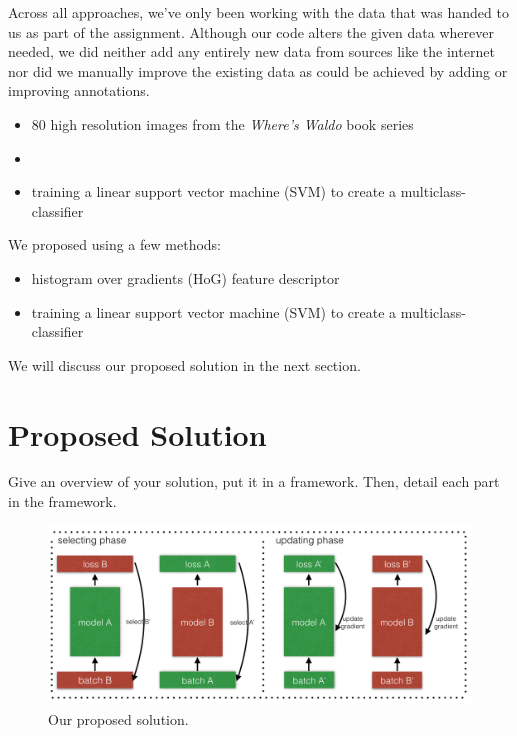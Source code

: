 \documentclass[11pt]{article}
\begin{document}
Across all approaches, we've only been working with the data that was handed to us as part of the assignment. Although our code alters the given data wherever needed, we did neither add any entirely new data from sources like the internet nor did we manually improve the existing data as could be achieved by adding or improving annotations.\\

\begin{itemize}
    \item 80 high resolution images from the \textit{Where's Waldo} book series
    \item 
    \item training a linear support vector machine (SVM) to create a multiclass-classifier
\end{itemize}



We proposed using a few methods:

\begin{itemize}
    \item histogram over gradients (HoG) feature descriptor
    \item training a linear support vector machine (SVM) to create a multiclass-classifier
\end{itemize}

We will discuss our proposed solution in the next section.\\


\section{Proposed Solution}
Give an overview of your solution, put it in a framework. Then, detail each part in the framework.

\begin{figure}[ht]
\centering
    \includegraphics[width=14cm]{figures/coteaching.png}
    \caption{Our proposed solution.}
    \label{fig:framework}
\end{figure}
\end{document}
